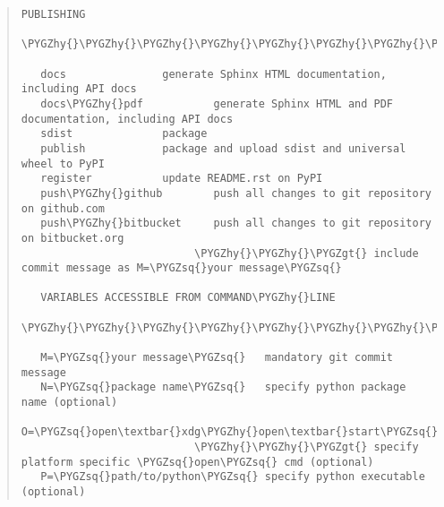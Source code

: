 \documentclass[letterpaper,10pt,english]{sphinxmanual}
\def\PYGZgt{\char`\>}
\def\PYGZhy{\char`\-}
\def\PYGZsq{\char`\'}
\renewcommand\PYGZsq{\textquotesingle}
\begin{document}
\begin{quote}
\begin{Verbatim}[commandchars=\\\{\}]
   PUBLISHING
   \PYGZhy{}\PYGZhy{}\PYGZhy{}\PYGZhy{}\PYGZhy{}\PYGZhy{}\PYGZhy{}\PYGZhy{}\PYGZhy{}\PYGZhy{}

   docs               generate Sphinx HTML documentation, including API docs
   docs\PYGZhy{}pdf           generate Sphinx HTML and PDF documentation, including API docs
   sdist              package
   publish            package and upload sdist and universal wheel to PyPI
   register           update README.rst on PyPI
   push\PYGZhy{}github        push all changes to git repository on github.com
   push\PYGZhy{}bitbucket     push all changes to git repository on bitbucket.org
                           \PYGZhy{}\PYGZhy{}\PYGZgt{} include commit message as M=\PYGZsq{}your message\PYGZsq{}

   VARIABLES ACCESSIBLE FROM COMMAND\PYGZhy{}LINE
   \PYGZhy{}\PYGZhy{}\PYGZhy{}\PYGZhy{}\PYGZhy{}\PYGZhy{}\PYGZhy{}\PYGZhy{}\PYGZhy{}\PYGZhy{}\PYGZhy{}\PYGZhy{}\PYGZhy{}\PYGZhy{}\PYGZhy{}\PYGZhy{}\PYGZhy{}\PYGZhy{}\PYGZhy{}\PYGZhy{}\PYGZhy{}\PYGZhy{}\PYGZhy{}\PYGZhy{}\PYGZhy{}\PYGZhy{}\PYGZhy{}\PYGZhy{}\PYGZhy{}\PYGZhy{}\PYGZhy{}\PYGZhy{}\PYGZhy{}\PYGZhy{}\PYGZhy{}\PYGZhy{}\PYGZhy{}\PYGZhy{}

   M=\PYGZsq{}your message\PYGZsq{}   mandatory git commit message
   N=\PYGZsq{}package name\PYGZsq{}   specify python package name (optional)
   O=\PYGZsq{}open\textbar{}xdg\PYGZhy{}open\textbar{}start\PYGZsq{}
                           \PYGZhy{}\PYGZhy{}\PYGZgt{} specify platform specific \PYGZsq{}open\PYGZsq{} cmd (optional)
   P=\PYGZsq{}path/to/python\PYGZsq{} specify python executable (optional)
\end{Verbatim}
\end{quote}
\end{document}
